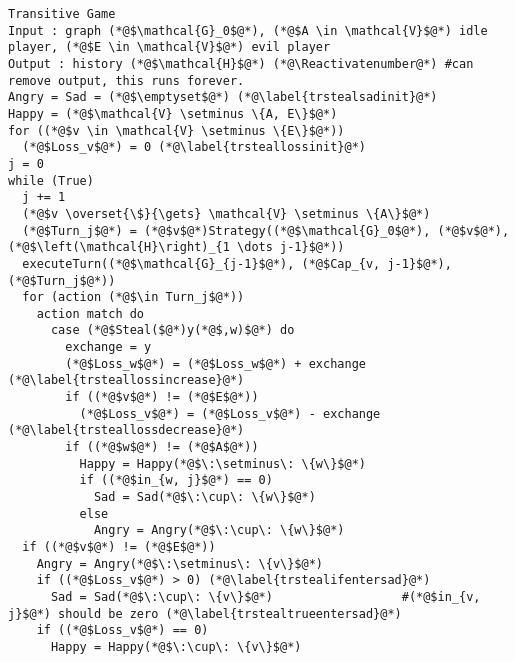 \documentclass[11pt]{llncs}
\makeatletter
\newcommand*\Suppressnumber{%
  \lst@AddToHook{OnNewLine}{%
    \let\thelstnumber\relax%
     \advance\c@lstnumber-\@ne\relax%
    }%
}
\theoremstyle{definition}
\makeatother
\begin{document}
     \Suppressnumber
     \begin{lstlisting}[label=transitivegame, style=numbers]
Transitive Game
Input : graph (*@$\mathcal{G}_0$@*), (*@$A \in \mathcal{V}$@*) idle player, (*@$E \in \mathcal{V}$@*) evil player
Output : history (*@$\mathcal{H}$@*) (*@\Reactivatenumber@*) #can remove output, this runs forever.
Angry = Sad = (*@$\emptyset$@*) (*@\label{trstealsadinit}@*)
Happy = (*@$\mathcal{V} \setminus \{A, E\}$@*)
for ((*@$v \in \mathcal{V} \setminus \{E\}$@*))
  (*@$Loss_v$@*) = 0 (*@\label{trsteallossinit}@*)
j = 0
while (True)
  j += 1
  (*@$v \overset{\$}{\gets} \mathcal{V} \setminus \{A\}$@*)
  (*@$Turn_j$@*) = (*@$v$@*)Strategy((*@$\mathcal{G}_0$@*), (*@$v$@*), (*@$\left(\mathcal{H}\right)_{1 \dots j-1}$@*))
  executeTurn((*@$\mathcal{G}_{j-1}$@*), (*@$Cap_{v, j-1}$@*), (*@$Turn_j$@*))
  for (action (*@$\in Turn_j$@*))
    action match do
      case (*@$Steal($@*)y(*@$,w)$@*) do
        exchange = y
        (*@$Loss_w$@*) = (*@$Loss_w$@*) + exchange (*@\label{trsteallossincrease}@*)
        if ((*@$v$@*) != (*@$E$@*))
          (*@$Loss_v$@*) = (*@$Loss_v$@*) - exchange (*@\label{trsteallossdecrease}@*)
        if ((*@$w$@*) != (*@$A$@*))
          Happy = Happy(*@$\:\setminus\: \{w\}$@*)
          if ((*@$in_{w, j}$@*) == 0)
            Sad = Sad(*@$\:\cup\: \{w\}$@*)
          else
            Angry = Angry(*@$\:\cup\: \{w\}$@*)
  if ((*@$v$@*) != (*@$E$@*))
    Angry = Angry(*@$\:\setminus\: \{v\}$@*)
    if ((*@$Loss_v$@*) > 0) (*@\label{trstealifentersad}@*) 
      Sad = Sad(*@$\:\cup\: \{v\}$@*)                  #(*@$in_{v, j}$@*) should be zero (*@\label{trstealtrueentersad}@*)
    if ((*@$Loss_v$@*) == 0)
      Happy = Happy(*@$\:\cup\: \{v\}$@*)
     \end{lstlisting}
\end{document}
